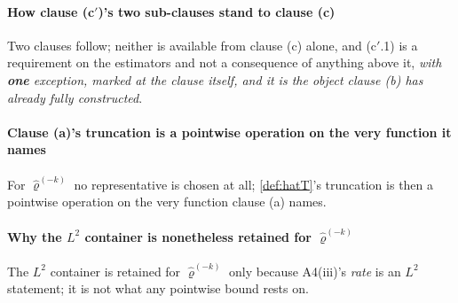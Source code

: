 \paragraph{How clause \textup{(c$'$)}'s two sub-clauses stand to clause \textup{(c)}}

Two clauses follow; neither is available from clause \textup{(c)} alone, and
\textup{(c$'$.1)} is a requirement on the estimators and not a consequence of anything above it, 
\emph{with \textbf{one} exception, marked at the clause itself, and it is the object clause \textup{(b)} has
already fully constructed}.

\paragraph{Clause \textup{(a)}'s truncation is a pointwise operation on the very function it names}

For $\hat\varrho^{(-k)}$ no representative is chosen at all; \cref{def:hatT}'s truncation is then a pointwise operation on the very
function clause \textup{(a)} names.

\paragraph{Why the $L^{2}$ container is nonetheless retained for $\hat\varrho^{(-k)}$}

The $L^{2}$ container is retained
for $\hat\varrho^{(-k)}$ only because A4(iii)'s \emph{rate} is an $L^{2}$ statement; it is not what any
pointwise bound rests on.
